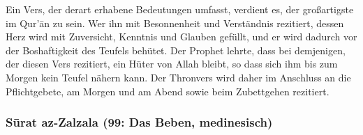 \begin{merke}
Ein Vers, der derart erhabene Bedeutungen umfasst, verdient es, der großartigste im Qur’ān zu
sein. Wer ihn mit Besonnenheit und Verständnis rezitiert, dessen Herz wird mit Zuversicht,
Kenntnis und Glauben gefüllt, und er wird dadurch vor der Boshaftigkeit des Teufels behütet. Der
Prophet  lehrte, dass bei demjenigen, der diesen Vers rezitiert, ein Hüter von Allah bleibt,
so dass sich ihm bis zum Morgen kein Teufel nähern kann. Der Thronvers wird daher im Anschluss
an die Pflichtgebete, am Morgen und am Abend sowie beim Zubettgehen rezitiert.
\end{merke}

\subsubsection*{Sūrat az-Zalzala (99: Das Beben, medinesisch)}


